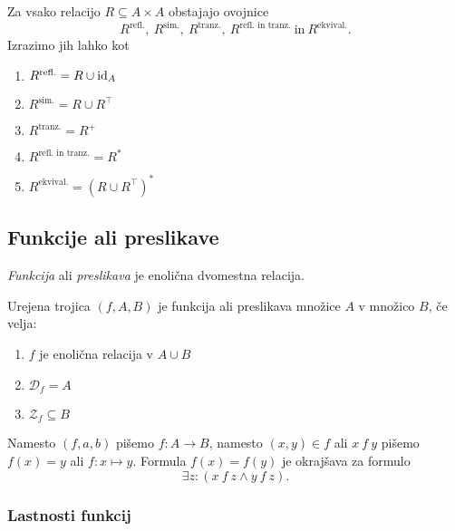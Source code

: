 \documentclass[12pt, a4paper]{article}
\begin{document}
\begin{izrek}
Za vsako relacijo $R\subseteq A\times A$ obstajajo ovojnice
\[
R^{\text{refl.}},~R^{\text{sim.}},~R^{\text{tranz.}},~R^{\text{refl. in tranz.}}~\text{in}~R^{\text{ekvival.}}.
\]
Izrazimo jih lahko kot

\begin{enumerate}
\item $R^{\text{refl.}}=R\cup\operatorname{id}_A$
\item $R^{\text{sim.}}=R\cup R^\top$
\item $R^{\text{tranz.}}=R^+$
\item $R^{\text{refl. in tranz.}}=R^*$
\item $R^{\text{ekvival.}}=(R\cup R^\top)^*$
\end{enumerate}
\end{izrek}

\obvs

\newpage

\subsection{Funkcije ali preslikave}

\begin{okvir}
\begin{definicija}
\emph{Funkcija} ali \emph{preslikava} je enolična dvomestna relacija.
\end{definicija}
\end{okvir}

\begin{definicija}
Urejena trojica $(f,A,B)$ je funkcija ali preslikava množice $A$ v množico $B$, če velja:

\begin{enumerate}
\item $f$ je enolična relacija v $A\cup B$
\item $\mathcal{D}_f=A$
\item $\mathcal{Z}_f\subseteq B$
\end{enumerate}
\end{definicija}

Namesto $(f,a,b)$ pišemo $f\colon A\to B$, namesto $(x,y)\in f$ ali $x~f~y$ pišemo $f(x)=y$ ali $f\colon x\mapsto y$. Formula $f(x)=f(y)$ je okrajšava za formulo
\[
\exists z\colon (x~f~z\land y~f~z).
\]

\subsubsection{Lastnosti funkcij}
\end{document}
